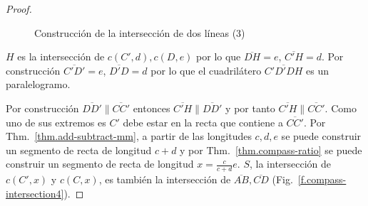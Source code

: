\begin{proof}
\begin{figure}[b]
\begin{center}
\end{center}
\caption{Construcción de la intersección de dos líneas (3)}\label{f.compass-intersection3}
\end{figure}

$H$ es la intersección de $c(C',d), c(D,e)$ por lo que $\overline{DH}=e$, $\overline{C'H}=d$. Por construcción $\overline{C'D'} = e$, $\overline{D'D}=d$ por lo que el cuadrilátero $\overline{C'D'DH}$ es un paralelogramo. 

Por construcción $\overline{DD'}\parallel\overline{CC'}$ entonces $\overline{C'H}\parallel \overline{DD'}$ y por tanto $\overline{C'H}\parallel\overline{CC'}$. Como uno de sus extremos es $C'$ debe estar en la recta que contiene a $\overline{CC'}$. Por Thm.~\ref{thm.add-subtract-mm}, a partir de las longitudes $c,d,e$ se puede construir un segmento de recta de longitud $c+d$ y por Thm.~\ref{thm.compass-ratio} se puede construir un segmento de recta de longitud $x=\displaystyle\frac{c}{c+d}e$. $S$, la intersección de $c(C',x)$ y $c(C,x)$, es también la intersección de $\overline{AB}, \overline{CD}$ (Fig.~\ref{f.compass-intersection4}).
\end{proof}

